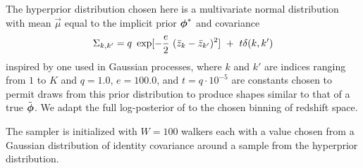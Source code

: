 The hyperprior distribution chosen here is a multivariate normal distribution with mean $\vec{\mu}$ equal to the implicit prior ${\boldsymbol{\phi}}^{*}$ and covariance
\begin{equation}
\eqlabel{eqn:priorcov}
\Sigma_{k,k'} = q\ \exp[-\frac{e}{2}\ (\bar{z}_{k}-\bar{z}_{k'})^{2}]\ +\ t\delta(k,k')
\end{equation}
inspired by one used in Gaussian processes, where $k$ and $k'$ are indices ranging from $1$ to $K$ and $q=1.0$, $e=100.0$, and $t=q\cdot10^{-5}$ are constants chosen to permit draws from this prior distribution to produce shapes similar to that of a true $\tilde{{\boldsymbol{\phi}}}$.  
We adapt the full log-posterior of  to the chosen binning of redshift space.
%

The sampler is initialized with $W=100$ walkers each with a value chosen from a Gaussian distribution of identity covariance around a sample from the hyperprior distribution.  


%


